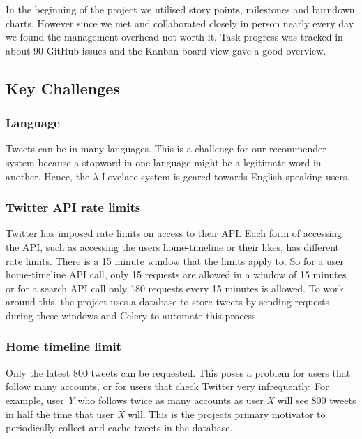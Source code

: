 \documentclass{article}
\begin{document}
In the beginning of the project we utilised story points, milestones and burndown charts. However since we met and collaborated closely in person nearly every day we found the management overhead not worth it. Task progress was tracked in about 90 GitHub issues and the Kanban board view gave a good overview.

\subsection{Key Challenges} %

\subsubsection*{Language} %
Tweets can be in many languages. This is a challenge for our recommender system because a stopword in one language might be a legitimate word in another. Hence, the $\lambda$ Lovelace system is geared towards English speaking users.


\subsubsection*{Twitter API rate limits} %
Twitter has imposed rate limits on access to their API. Each form of accessing the API, such as accessing the users home-timeline or their likes, has different rate limits. There is a 15 minute window that the limits apply to. So for a user home-timeline API call, only 15 requests are allowed in a window of 15 minutes or for a search API call only 180 requests every 15 minutes is allowed. To work around this, the project uses a database to store tweets by sending requests during these windows and Celery to automate this process.
    
\subsubsection*{Home timeline limit} %
Only the latest 800 tweets can be requested. This poses a problem for users that follow many accounts, or for users that check Twitter very infrequently. For example, user \textit{Y} who follows twice as many accounts as user \textit{X} will see 800 tweets in half the time that user \textit{X} will. This is the projects primary motivator to periodically collect and cache tweets in the database.
\end{document}
